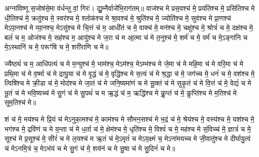 

अग्ना॑विष्णू स॒जोष॑से॒मा व॑र्धन्तु वां॒ गिरः॑। द्यु॒म्नैर्वाजे॑भि॒रा\-ग॑तम्॥ 
वाज॑श्च मे प्रस॒वश्च॑ मे॒ प्रय॑तिश्च मे॒ प्रसि॑तिश्च मे धी॒तिश्च॑ मे॒ क्रतु॑श्च मे॒ स्वर॑श्च मे॒ श्लोक॑श्च मे श्रा॒वश्च॑ मे॒ श्रुति॑श्च मे॒ ज्योति॑श्च मे॒ सुव॑श्च मे प्रा॒णश्च॑ मेऽपा॒नश्च॑ मे व्या॒नश्च॒ मेऽसु॑श्च मे चि॒त्तं च॑ म॒ आधी॑तं च मे॒ वाक्च॑ मे॒ मन॑श्च मे॒ चक्षु॑श्च मे॒ श्रोत्रं॑ च मे॒ दक्ष॑श्च मे॒ बलं॑ च म॒ ओज॑श्च मे॒ सह॑श्च म॒ आयु॑श्च मे ज॒रा च॑ म आ॒त्मा च॑ मे त॒नूश्च॑ मे॒ शर्म॑ च मे॒ वर्म॑ च मे॒ऽङ्गा॑नि च मे॒ऽस्थानि॑ च मे॒ परूꣳ॑षि च मे॒ शरी॑राणि च मे॥



ज्यैष्ठ्यं॑ च म॒ आधि॑पत्यं च मे म॒न्युश्च॑ मे॒ भाम॑श्च॒ मेऽम॑श्च॒ मेऽम्भ॑श्च मे जे॒मा च॑ मे महि॒मा च॑ मे वरि॒मा च॑ मे प्रथि॒मा च॑ मे व॒र्ष्मा च॑ मे द्राघु॒या च॑ मे वृ॒द्धं च॑ मे॒ वृद्धि॑श्च मे स॒त्यं च॑ मे श्र॒द्धा च॑ मे॒ जग॑च्च मे॒ धनं॑ च मे॒ वश॑श्च मे॒ त्विषि॑श्च मे क्री॒डा च॑ मे॒ मोद॑श्च मे जा॒तं च॑ मे जनि॒ष्यमा॑णं च मे सू॒क्तं च॑ मे सुकृ॒तं च॑ मे वि॒त्तं च॑ मे॒ वेद्यं॑ च मे भू॒तं च॑ मे भवि॒ष्यच्च॑ मे सु॒गं च॑ मे सु॒पथं॑ च म ऋ॒द्धं च॑ म॒ ऋद्धि॑श्च मे कॢ॒प्तं च॑ मे॒ कॢप्ति॑श्च मे म॒तिश्च॑ मे सुम॒तिश्च॑ मे॥




शं च॑ मे॒ मय॑श्च मे प्रि॒यं च॑ मेऽनुका॒मश्च॑ मे॒ काम॑श्च मे सौमन॒सश्च॑ मे भ॒द्रं च॑ मे॒ श्रेय॑श्च मे॒ वस्य॑श्च मे॒ यश॑श्च मे॒ भग॑श्च मे॒ द्रवि॑णं च मे य॒न्ता च॑ मे ध॒र्ता च॑ मे॒ क्षेम॑श्च मे॒ धृति॑श्च मे॒ विश्वं॑ च मे॒ मह॑श्च मे सं॒विच्च॑ मे॒ ज्ञात्रं॑ च मे॒ सूश्च॑ मे प्र॒सूश्च॑ मे॒ सीरं॑ च मे ल॒यश्च॑ म ऋ॒तं च॑ मे॒ऽमृतं॑ च मेऽय॒क्ष्मं च॒ मेऽना॑मयच्च मे जी॒वातु॑श्च मे दीर्घायु॒त्वं च॑ मेऽनमि॒त्रं च॒ मेऽभ॑यं च मे सु॒गं च॑ मे॒ शय॑नं च मे सू॒षा च॑ मे सु॒दिनं॑ च मे॥

